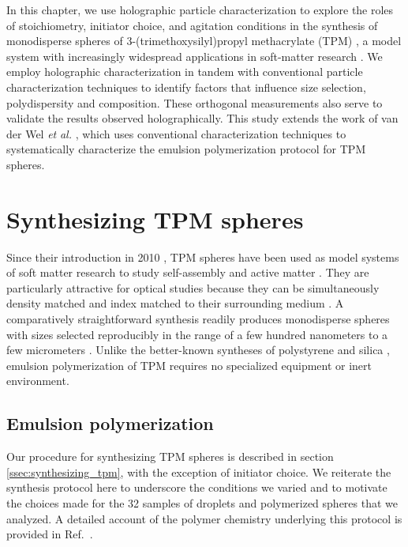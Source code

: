 In this chapter, we use holographic particle characterization
to explore the roles of stoichiometry, initiator choice, and
agitation conditions in the synthesis of monodisperse spheres of
3-(trimethoxysilyl)propyl methacrylate (TPM) \cite{vanderwel17},
a model system with increasingly widespread applications
in soft-matter research \cite{sacanna11,liu16,vanderwel18}.
We employ holographic characterization
in tandem with conventional particle characterization
techniques to identify factors that influence size selection, polydispersity
and composition.
These orthogonal measurements also serve to validate the results observed
holographically.
This study extends the work of van der Wel \emph{et} \emph{al.} \cite{vanderwel17}, which
uses conventional characterization techniques to systematically
characterize the emulsion polymerization protocol for TPM spheres.

\section{Synthesizing TPM spheres}

Since their introduction in 2010 \cite{sacanna10}, TPM spheres have been used as
model systems of soft matter research to
study self-assembly \cite{sacanna13} and active matter \cite{palacci13}.
They are particularly attractive for optical studies because they can be
simultaneously density matched and index matched to their surrounding
medium \cite{liu16}.
A comparatively straightforward synthesis readily produces monodisperse spheres
with sizes selected reproducibly in the range of a few hundred nanometers to a
few micrometers \cite{liu16}.
Unlike the better-known syntheses of polystyrene \cite{goodwin1974} and
silica \cite{stober68},
emulsion polymerization of TPM requires no specialized equipment or
inert environment.

\subsection{Emulsion polymerization}
\label{ssec:polymerization}

Our procedure for synthesizing TPM spheres is described in section
\ref{ssec:synthesizing_tpm}, with the
exception of initiator choice. We reiterate the synthesis protocol
here to underscore the conditions we varied and to motivate the choices
made for the
\num{32} samples of droplets and polymerized spheres that we analyzed.
A detailed account of the polymer chemistry underlying this
protocol is provided in Ref.~\cite{vanderwel17}.

